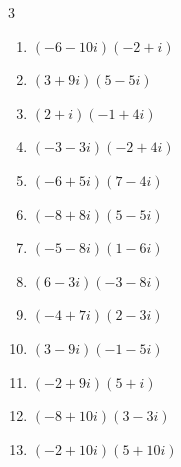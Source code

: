 \begin{multicols}{3}
\begin{enumerate}
        \phantom{$\displaystyle =54-90i$}

  \item $\displaystyle (-6-10i)(-2+i)$

        \phantom{$\displaystyle =22+14i$}

  \item $\displaystyle (3+9i)(5-5i)$

        \phantom{$\displaystyle =60+30i$}

  \item $\displaystyle (2+i)(-1+4i)$

        \phantom{$\displaystyle =-6+7i$}

  \item $\displaystyle (-3-3i)(-2+4i)$

        \phantom{$\displaystyle =18-6i$}

\columnbreak %

  \item $\displaystyle (-6+5i)(7-4i)$

        \phantom{$\displaystyle =-22+59i$}

  \item $\displaystyle (-8+8i)(5-5i)$

        \phantom{$\displaystyle =80i$}

  \item $\displaystyle (-5-8i)(1-6i)$

        \phantom{$\displaystyle =-53+22i$}

  \item $\displaystyle (6-3i)(-3-8i)$

        \phantom{$\displaystyle =-42-39i$}

  \item $\displaystyle (-4+7i)(2-3i)$

        \phantom{$\displaystyle =13+26i$}

  \item $\displaystyle (3-9i)(-1-5i)$

        \phantom{$\displaystyle =-48-6i$}

  \item $\displaystyle (-2+9i)(5+i)$

        \phantom{$\displaystyle =-19+43i$}

  \item $\displaystyle (-8+10i)(3-3i)$

        \phantom{$\displaystyle =6+54i$}

  \item $\displaystyle (-2+10i)(5+10i)$


\end{enumerate}
\end{multicols}
